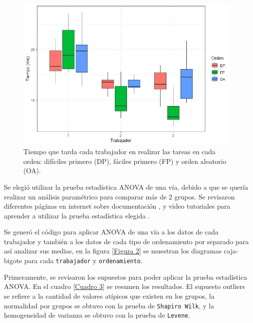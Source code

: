\documentclass{article}
\begin{document}
\begin{figure} [h!]%
    \centering
    \includegraphics[width=150mm]{Figura1.jpeg} %
    \caption{Tiempo que tarda cada trabajador en realizar las tareas en cada orden: difíciles primero (DP), fáciles primero (FP) y orden aleatorio (OA).}
    \label{Figura 1}
\end{figure} 
    
\smallskip

Se elegió utilizar la prueba estadística ANOVA de una vía, debido a que se quería realizar un análisis paramétrico para comparar más de 2 grupos. Se revisaron diferentes páginas en internet sobre documentación \citep{2}, y video tutoriales \citep{3,4} para aprender a utilizar la prueba estadística elegida \citep{5}.
\bigskip

Se generó el código para aplicar ANOVA de una vía a los datos de cada trabajador y también a los datos de cada tipo de ordenamiento por separado para así analizar sus medias, en la figura \ref{Figura 2} se muestran los diagramas caja-bigote para cada \texttt{trabajador} y \texttt{ordenamiento}. 
\bigskip

Primeramente, se revisaron los supuestos para poder aplicar la prueba estadística ANOVA. En el cuadro \ref{Cuadro 3} se  resumen los resultados. El supuesto outliers se refiere a la cantidad de valores atípicos que existen en los grupos, la normalidad por grupos se obtuvo con la prueba de \texttt{Shapiro Wilk}, y la homogeneidad de varianza se obtuvo con la prueba de \texttt{Levene}.
\end{document}
